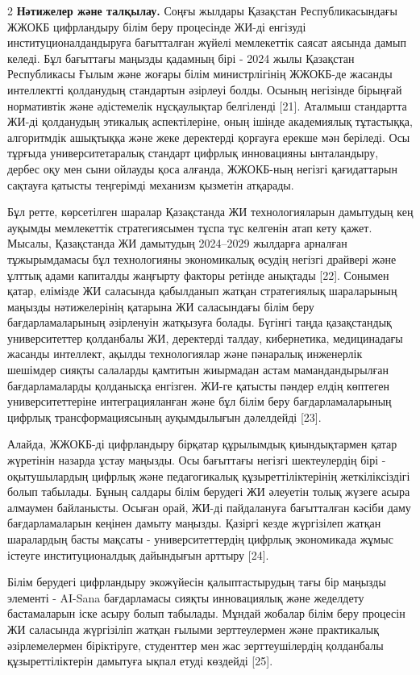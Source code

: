 \begin{multicols}{2}
{\bfseries Нәтижелер және талқылау.} Соңғы жылдары Қазақстан
Республикасындағы ЖЖОКБ цифрландыру білім беру процесінде ЖИ-ді енгізуді
институционалдандыруға бағытталған жүйелі мемлекеттік саясат аясында
дамып келеді. Бұл бағыттағы маңызды қадамның бірі - 2024 жылы Қазақстан
Республикасы Ғылым және жоғары білім министрлігінің ЖЖОКБ-де жасанды
интеллектті қолданудың стандартын әзірлеуі болды. Осының негізінде
бірыңғай нормативтік және әдістемелік нұсқаулықтар белгіленді {[}21{]}.
Аталмыш стандартта ЖИ-ді қолданудың этикалық аспектілеріне, оның ішінде
академиялық тұтастыққа, алгоритмдік ашықтыққа және жеке деректерді
қорғауға ерекше мән беріледі. Осы тұрғыда университетаралық стандарт
цифрлық инновацияны ынталандыру, дербес оқу мен сыни ойлауды қоса
алғанда, ЖЖОКБ-ның негізгі қағидаттарын сақтауға қатысты теңгерімді
механизм қызметін атқарады.

Бұл ретте, көрсетілген шаралар Қазақстанда ЖИ технологияларын дамытудың
кең ауқымды мемлекеттік стратегиясымен тұспа тұс келгенін атап кету
қажет. Мысалы, Қазақстанда ЖИ дамытудың 2024--2029 жылдарға арналған
тұжырымдамасы бұл технологияны экономикалық өсудің негізгі драйвері және
ұлттық адами капиталды жаңғырту факторы ретінде анықтады {[}22{]}.
Сонымен қатар, елімізде ЖИ саласында қабылданып жатқан стратегиялық
шараларының маңызды нәтижелерінің қатарына ЖИ саласындағы білім беру
бағдарламаларының әзірленуін жатқызуға болады. Бүгінгі таңда
қазақстандық университеттер қолданбалы ЖИ, деректерді талдау,
кибернетика, медицинадағы жасанды интеллект, ақылды технологиялар және
пәнаралық инженерлік шешімдер сияқты салаларды қамтитын жиырмадан астам
мамандандырылған бағдарламаларды қолданысқа енгізген. ЖИ-ге қатысты
пәндер елдің көптеген университеттеріне интеграцияланған және бұл білім
беру бағдарламаларының цифрлық трансформациясының ауқымдылығын
дәлелдейді {[}23{]}.

Алайда, ЖЖОКБ-ді цифрландыру бірқатар құрылымдық қиындықтармен қатар
жүретінін назарда ұстау маңызды. Осы бағыттағы негізгі шектеулердің бірі
- оқытушылардың цифрлық және педагогикалық құзыреттіліктерінің
жеткіліксіздігі болып табылады. Бұның салдары білім берудегі ЖИ әлеуетін
толық жүзеге асыра алмаумен байланысты. Осыған орай, ЖИ-ді пайдалануға
бағытталған кәсіби даму бағдарламаларын кеңінен дамыту маңызды. Қазіргі
кезде жүргізілеп жатқан шаралардың басты мақсаты - университеттердің
цифрлық экономикада жұмыс істеуге институционалдық дайындығын арттыру
{[}24{]}.

Білім берудегі цифрландыру экожүйесін қалыптастырудың тағы бір маңызды
элементі - AI-Sana бағдарламасы сияқты инновациялық және жеделдету
бастамаларын іске асыру болып табылады. Мұндай жобалар білім беру
процесін ЖИ саласында жүргізіліп жатқан ғылыми зерттеулермен және
практикалық әзірлемелермен біріктіруге, студенттер мен жас
зерттеушілердің қолданбалы құзыреттіліктерін дамытуға ықпал етуді
көздейді {[}25{]}.


\end{multicols}
